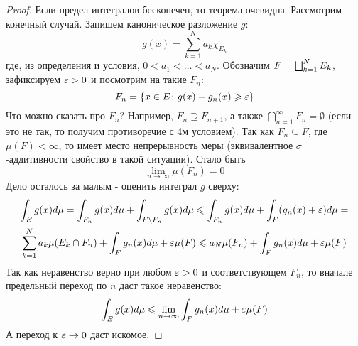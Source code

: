 \begin{proof}
	Если предел интегралов бесконечен, то теорема очевидна. Рассмотрим конечный случай. Запишем каноническое разложение $g$:
	\[
		g(x) = \sum_{k = 1}^N a_k \chi_{E_k}
	\]
	где, из определения и условия, $0 < a_1 < \ldots < a_N$. Обозначим $F = \bigsqcup_{k = 1}^N E_k$, зафиксируем $\varepsilon > 0$ и посмотрим на такие $F_n$:
	\[
		F_n = \{x \in E \colon g(x) - g_n(x) \geqslant \varepsilon\}
	\]
	Что можно сказать про $F_n$? Например, $F_n \supseteq F_{n + 1}$, а также $\bigcap_{n = 1}^\infty F_n = \emptyset$ (если это не так, то получим противоречие с 4м условием). Так как $F_n \subseteq F$, где $\mu(F) < \infty$, то имеет место непрерывность меры (эквивалентное $\sigma$-аддитивности свойство в такой ситуации). Стало быть
	\[
		\lim_{n \to \infty} \mu(F_n) = 0
	\]
	Дело осталось за малым - оценить интеграл $g$ сверху:
	\begin{multline*}
		\int_E g(x)d\mu = \int_{F_n} g(x)d\mu + \int_{F \backslash F_n} g(x)d\mu \leqslant \int_{F_n} g(x)d\mu + \int_F (g_n(x) + \varepsilon)d\mu =
		\\
		\sum_{k = 1}^N a_k\mu(E_k \cap F_n) + \int_F g_n(x)d\mu + \varepsilon\mu(F) \leqslant a_N \mu(F_n) + \int_F g_n(x)d\mu + \varepsilon\mu(F)
	\end{multline*}
	Так как неравенство верно при любом $\varepsilon > 0$ и соответствующем $F_n$, то вначале предельный переход по $n$ даст такое неравенство:
	\[
		\int_E g(x)d\mu \leqslant \lim_{n \to \infty} \int_F g_n(x)d\mu + \varepsilon\mu(F)
	\]
	А переход к $\varepsilon \to 0$ даст искомое.
\end{proof}